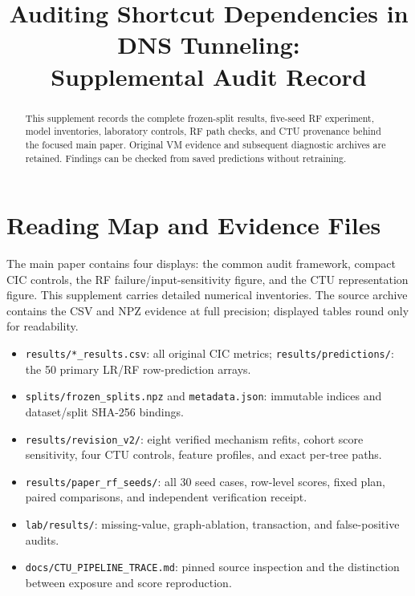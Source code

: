 \documentclass[conference]{IEEEtran}
\newcommand{\code}[1]{\texttt{#1}}
\begin{document}
\title{Auditing Shortcut Dependencies in DNS Tunneling:\\Supplemental Audit Record}
\author{
}
\maketitle
\begin{abstract}
This supplement records the complete frozen-split results, five-seed RF experiment, model inventories, laboratory controls, RF path checks, and CTU provenance behind the focused main paper. Original VM evidence and subsequent diagnostic archives are retained. Findings can be checked from saved predictions without retraining.
\end{abstract}

\section{Reading Map and Evidence Files}
The main paper contains four displays: the common audit framework, compact CIC controls, the RF failure/input-sensitivity figure, and the CTU representation figure. This supplement carries detailed numerical inventories. The source archive contains the CSV and NPZ evidence at full precision; displayed tables round only for readability.

\begin{itemize}
\item \code{results/*\_results.csv}: all original CIC metrics; \code{results/predictions/}: the 50 primary LR/RF row-prediction arrays.
\item \code{splits/frozen\_splits.npz} and \code{metadata.json}: immutable indices and dataset/split SHA-256 bindings.
\item \code{results/revision\_v2/}: eight verified mechanism refits, cohort score sensitivity, four CTU controls, feature profiles, and exact per-tree paths.
\item \code{results/paper\_rf\_seeds/}: all 30 seed cases, row-level scores, fixed plan, paired comparisons, and independent verification receipt.
\item \code{lab/results/}: missing-value, graph-ablation, transaction, and false-positive audits.
\item \code{docs/CTU\_PIPELINE\_TRACE.md}: pinned source inspection and the distinction between exposure and score reproduction.
\end{itemize}
\end{document}

